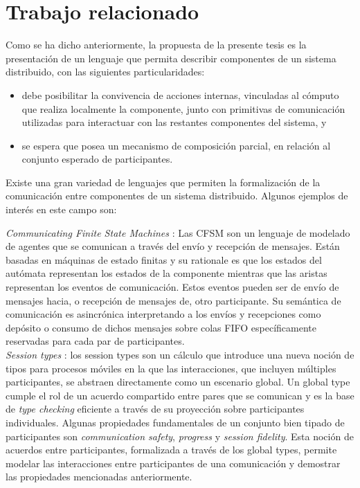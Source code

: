 \section*{Trabajo relacionado}
\label{trabajo-relacionado}
Como se ha dicho anteriormente, la propuesta de la presente tesis es la presentación de un lenguaje que permita describir componentes de un sistema distribuido, con las siguientes particularidades: 
\begin{itemize}
\item debe posibilitar la convivencia de acciones internas, vinculadas al cómputo que realiza localmente la componente, junto con primitivas de comunicación utilizadas para interactuar con las restantes componentes del sistema, y
\item se espera que posea un mecanismo de composición parcial, en relación al conjunto esperado de participantes.
\end{itemize}

Existe una gran variedad de lenguajes que permiten la formalización de la comunicación entre componentes de un sistema distribuido. Algunos ejemplos de interés en este campo son:

\emph{Communicating Finite State Machines} \cite{brand:jacm-30_2}: Las CFSM son un lenguaje de modelado de agentes que se comunican a través del envío y recepción de mensajes. Están basadas en máquinas de estado finitas y su rationale es que los estados del autómata representan los estados de la componente mientras que las aristas representan los eventos de comunicación. Estos eventos pueden ser de envío de mensajes hacia, o recepción de mensajes de, otro participante. Su semántica de comunicación es asincrónica interpretando a los envíos y recepciones como depósito o consumo de dichos mensajes sobre colas FIFO específicamente reservadas para cada par de participantes.\\

\emph{Session types} \cite{honda:esop98,honda:popl08}: los session types son un cálculo que introduce una nueva noción de tipos para procesos móviles en la que las interacciones, que incluyen múltiples participantes, se abstraen directamente como un escenario global. Un global type cumple el rol de un acuerdo compartido entre pares que se comunican y es la base de \emph{type checking} eficiente a través de su proyección sobre participantes individuales. Algunas propiedades fundamentales de un conjunto bien tipado de participantes son \emph{communication safety}, \emph{progress} y \emph{session fidelity}. Esta noción de acuerdos entre participantes, formalizada a través de los global types, permite modelar las interacciones entre participantes de una comunicación y demostrar las propiedades mencionadas anteriormente.\\

